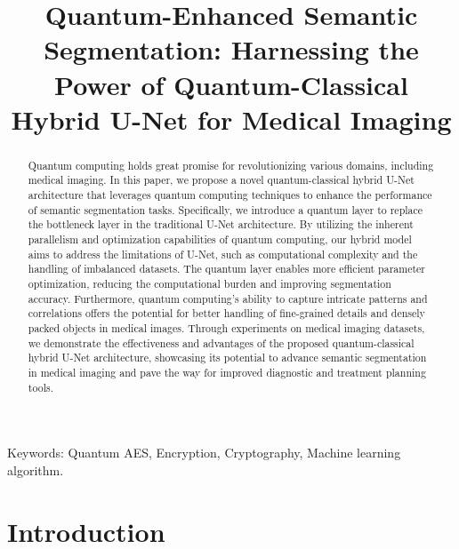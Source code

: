 \documentclass[conference]{IEEEtran}
\title{Quantum-Enhanced Semantic Segmentation: Harnessing the Power of Quantum-Classical Hybrid U-Net for Medical Imaging}
\begin{document}
\maketitle
\begin{abstract}
Quantum computing holds great promise for revolutionizing various domains, including medical imaging. In this paper, we propose a novel quantum-classical hybrid U-Net architecture that leverages quantum computing techniques to enhance the performance of semantic segmentation tasks. Specifically, we introduce a quantum layer to replace the bottleneck layer in the traditional U-Net architecture. By utilizing the inherent parallelism and optimization capabilities of quantum computing, our hybrid model aims to address the limitations of U-Net, such as computational complexity and the handling of imbalanced datasets. The quantum layer enables more efficient parameter optimization, reducing the computational burden and improving segmentation accuracy. Furthermore, quantum computing's ability to capture intricate patterns and correlations offers the potential for better handling of fine-grained details and densely packed objects in medical images. Through experiments on medical imaging datasets, we demonstrate the effectiveness and advantages of the proposed quantum-classical hybrid U-Net architecture, showcasing its potential to advance semantic segmentation in medical imaging and pave the way for improved diagnostic and treatment planning tools.
\end{abstract}

Keywords: Quantum AES, Encryption, Cryptography, Machine learning algorithm.
\section{Introduction}
\end{document}
